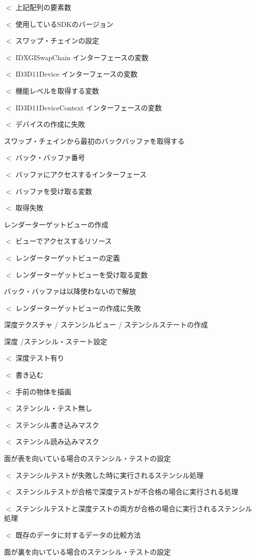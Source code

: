 $<$ 上記配列の要素数

$<$ 使用している\+S\+D\+Kのバージョン

$<$ スワップ・チェインの設定

$<$ I\+D\+X\+G\+I\+Swap\+Chain インターフェースの変数

$<$ I\+D3\+D11\+Device インターフェースの変数

$<$ 機能レベルを取得する変数

$<$ I\+D3\+D11\+Device\+Context インターフェースの変数

$<$ デバイスの作成に失敗

スワップ・チェインから最初のバックバッファを取得する

$<$ バック・バッファ番号

$<$ バッファにアクセスするインターフェース

$<$ バッファを受け取る変数

$<$ 取得失敗

レンダーターゲットビューの作成

$<$ ビューでアクセスするリソース

$<$ レンダーターゲットビューの定義

$<$ レンダーターゲットビューを受け取る変数

バック・バッファは以降使わないので解放

$<$ レンダーターゲットビューの作成に失敗

深度テクスチャ / ステンシルビュー / ステンシルステートの作成

深度 /ステンシル・ステート設定

$<$ 深度テスト有り

$<$ 書き込む

$<$ 手前の物体を描画

$<$ ステンシル・テスト無し

$<$ ステンシル書き込みマスク

$<$ ステンシル読み込みマスク

面が表を向いている場合のステンシル・テストの設定

$<$ ステンシルテストが失敗した時に実行されるステンシル処理

$<$ ステンシルテストが合格で深度テストが不合格の場合に実行される処理

$<$ ステンシルテストと深度テストの両方が合格の場合に実行されるステンシル処理

$<$ 既存のデータに対するデータの比較方法

面が裏を向いている場合のステンシル・テストの設定

